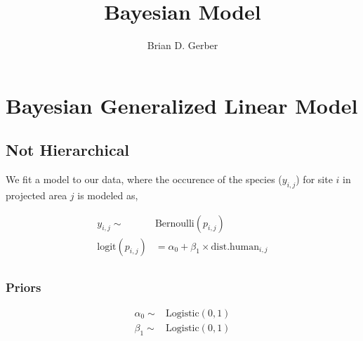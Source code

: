 \documentclass[12pt]{article}
\title{Bayesian  Model}
\author{Brian D. Gerber}
\begin{document}
\maketitle
\section{Bayesian Generalized Linear  Model}
\subsection{Not Hierarchical}

\Large

We fit a model to our data, where the occurence of the species ($y_{i,j}$) for site $i$ in projected area $j$ is modeled as,

\begin{align*}
y_{i,j}\sim& \text{Bernoulli}(p_{i,j})\\
\text{logit}(p_{i,j}) &= \alpha_{0} + \beta_{1}\times \text{dist.human}_{i,j}\\
\end{align*}

\subsubsection{Priors}

\begin{align*}
\alpha_{0} \sim& \text{Logistic}(0, 1)\\
\beta_{1} \sim& \text{Logistic}(0, 1)\\
\end{align*}
\end{document}
